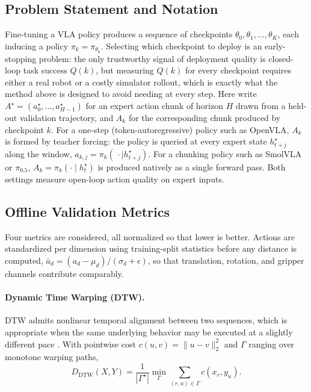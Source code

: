 \documentclass[english,12pt,a4paper,pdftex,elec,utf8]{aaltothesis}
\begin{document}
\subsection{Problem Statement and Notation}
\label{sec:method-notation}

Fine-tuning a VLA policy produces a sequence of checkpoints $\theta_0,\theta_1,\dots,\theta_K$, each inducing a policy $\pi_k=\pi_{\theta_k}$. Selecting which checkpoint to deploy is an early-stopping problem: the only trustworthy signal of deployment quality is closed-loop task success $Q(k)$, but measuring $Q(k)$ for every checkpoint requires either a real robot or a costly simulator rollout, which is exactly what the method above is designed to avoid needing at every step.
Here write $A^\star=(a^\star_0,\dots,a^\star_{H-1})$ for an expert action chunk of horizon $H$ drawn from
a held-out validation trajectory, and $A_k$ for the corresponding chunk produced by checkpoint $k$. For
a one-step (token-autoregressive) policy such as OpenVLA, $A_k$ is formed by teacher forcing: the
policy is queried at every expert state $h^\star_{t+j}$ along the window, $a_{k,j}=\pi_k(\,\cdot\mid
h^\star_{t+j})$. For a chunking policy such as SmolVLA or $\pi_{0.5}$, $A_k=\pi_k(\cdot\mid h^\star_t)$
is produced natively as a single forward pass. Both settings measure open-loop action quality on expert
inputs.

\subsection{Offline Validation Metrics}
\label{sec:method-metrics}

Four metrics are considered, all normalized so that lower is better. Actions are
standardized per dimension using training-split statistics before any distance is computed,
$\bar a_d=(a_d-\mu_d)/(\sigma_d+\epsilon)$, so that translation, rotation, and gripper channels
contribute comparably.

\paragraph{Dynamic Time Warping (DTW).} DTW admits nonlinear temporal alignment between two sequences,
which is appropriate when the same underlying behavior may be executed at a slightly different pace
\cite{sakoe1978dtw}. With pointwise cost $c(u,v)=\lVert u-v\rVert_2^2$ and $\Gamma$ ranging over
monotone warping paths,
\begin{equation}
  D_{\mathrm{DTW}}(X,Y) = \frac{1}{|\Gamma^\star|}\min_{\Gamma}\sum_{(r,u)\in\Gamma} c(x_r,y_u).
  \label{eq:dtw}
\end{equation}
\end{document}
